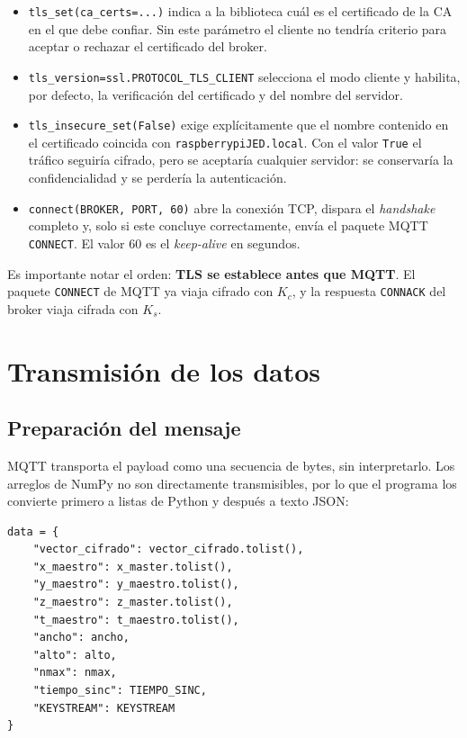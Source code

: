 \documentclass[12pt,a4paper]{article}
\newcommand{\Kc}{K_{c}}
\newcommand{\Ks}{K_{s}}
\begin{document}
\begin{itemize}[leftmargin=1.4cm]
	\item \texttt{tls\_set(ca\_certs=...)} indica a la biblioteca cuál es el certificado de la CA en el que debe confiar. Sin este parámetro el cliente no tendría criterio para aceptar o rechazar el certificado del broker.
	\item \texttt{tls\_version=ssl.PROTOCOL\_TLS\_CLIENT} selecciona el modo cliente y habilita, por defecto, la verificación del certificado y del nombre del servidor.
	\item \texttt{tls\_insecure\_set(False)} exige explícitamente que el nombre contenido en el certificado coincida con \texttt{raspberrypiJED.local}. Con el valor \texttt{True} el tráfico seguiría cifrado, pero se aceptaría cualquier servidor: se conservaría la confidencialidad y se perdería la autenticación.
	\item \texttt{connect(BROKER, PORT, 60)} abre la conexión TCP, dispara el \textit{handshake} completo y, solo si este concluye correctamente, envía el paquete MQTT \texttt{CONNECT}. El valor 60 es el \textit{keep-alive} en segundos.
\end{itemize}

Es importante notar el orden: \textbf{TLS se establece antes que MQTT}. El paquete \texttt{CONNECT} de MQTT ya viaja cifrado con $\Kc$, y la respuesta \texttt{CONNACK} del broker viaja cifrada con $\Ks$.

\section{Transmisión de los datos}

\subsection{Preparación del mensaje}

MQTT transporta el payload como una secuencia de bytes, sin interpretarlo. Los arreglos de NumPy no son directamente transmisibles, por lo que el programa los convierte primero a listas de Python y después a texto JSON:

\begin{lstlisting}[caption={Construcción del payload}]
data = {
    "vector_cifrado": vector_cifrado.tolist(),
    "x_maestro": x_master.tolist(),
    "y_maestro": y_maestro.tolist(),
    "z_maestro": z_master.tolist(),
    "t_maestro": t_maestro.tolist(),
    "ancho": ancho,
    "alto": alto,
    "nmax": nmax,
    "tiempo_sinc": TIEMPO_SINC,
    "KEYSTREAM": KEYSTREAM
}
\end{lstlisting}
\end{document}
